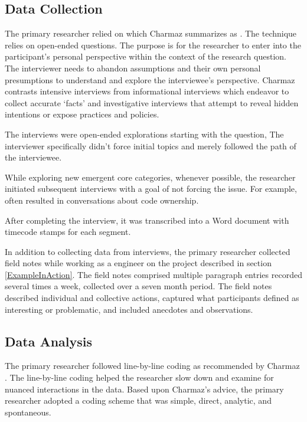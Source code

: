 \subsection{Data Collection}
The primary researcher relied on  which Charmaz summarizes as  \cite{Charmaz}. The technique relies on open-ended questions. The purpose is for the researcher to enter into the participant's personal perspective within the context of the research question. The interviewer needs to abandon assumptions and their own personal presumptions to understand and explore the interviewee's perspective. Charmaz \cite{Charmaz} contrasts intensive interviews from informational interviews which endeavor to collect accurate `facts' and investigative interviews that attempt to reveal hidden intentions or expose practices and policies. 
 
The interviews were open-ended explorations starting with the question,  The interviewer specifically didn't force initial topics and merely followed the path of the interviewee. 

While exploring new emergent core categories, whenever possible, the researcher initiated subsequent interviews with a goal of not forcing the issue. For example,  often resulted in conversations about code ownership. 

After completing the interview, it was transcribed into a Word document with timecode stamps for each segment.

In addition to collecting data from interviews, the primary researcher collected field notes while working as a engineer on the project described in section \ref{ExampleInAction}. The field notes comprised multiple paragraph entries recorded several times a week, collected over a seven month period. The field notes described individual and collective actions, captured what participants defined as interesting or problematic, and included anecdotes and observations. 
\subsection{Data Analysis}
The primary researcher followed line-by-line coding as recommended by Charmaz \cite{Charmaz}. The line-by-line coding helped the researcher slow down and examine for nuanced interactions in the data. Based upon Charmaz's advice, the primary researcher adopted a coding scheme that was simple, direct, analytic, and spontaneous.  

